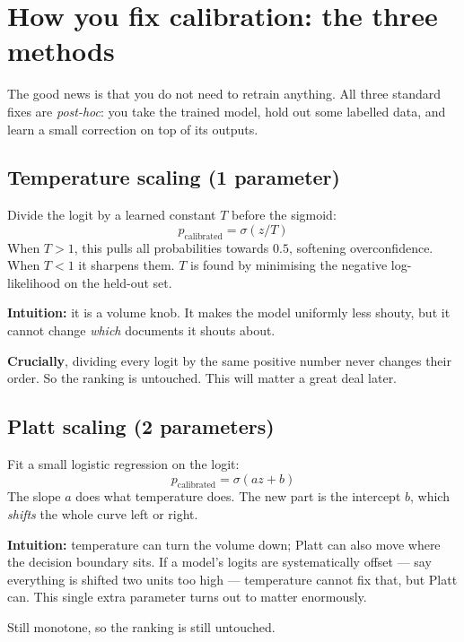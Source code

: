 \documentclass[11pt,a4paper]{article}
\begin{document}
\section{How you fix calibration: the three methods}

The good news is that you do not need to retrain anything. All three standard fixes
are \emph{post-hoc}: you take the trained model, hold out some labelled data, and
learn a small correction on top of its outputs.

\subsection{Temperature scaling (1 parameter)}
Divide the logit by a learned constant $T$ before the sigmoid:
\begin{equation}
p_{\text{calibrated}} = \sigma(z / T)
\end{equation}
When $T > 1$, this pulls all probabilities towards $0.5$, softening overconfidence.
When $T < 1$ it sharpens them. $T$ is found by minimising the negative
log-likelihood on the held-out set.

\textbf{Intuition:} it is a volume knob. It makes the model uniformly less shouty,
but it cannot change \emph{which} documents it shouts about.

\textbf{Crucially}, dividing every logit by the same positive number never changes
their order. So the ranking is untouched. This will matter a great deal later.

\subsection{Platt scaling (2 parameters)}
Fit a small logistic regression on the logit:
\begin{equation}
p_{\text{calibrated}} = \sigma(a z + b)
\end{equation}
The slope $a$ does what temperature does. The new part is the intercept $b$, which
\emph{shifts} the whole curve left or right.

\textbf{Intuition:} temperature can turn the volume down; Platt can also move where
the decision boundary sits. If a model's logits are systematically offset --- say
everything is shifted two units too high --- temperature cannot fix that, but Platt
can. This single extra parameter turns out to matter enormously.

Still monotone, so the ranking is still untouched.
\end{document}
